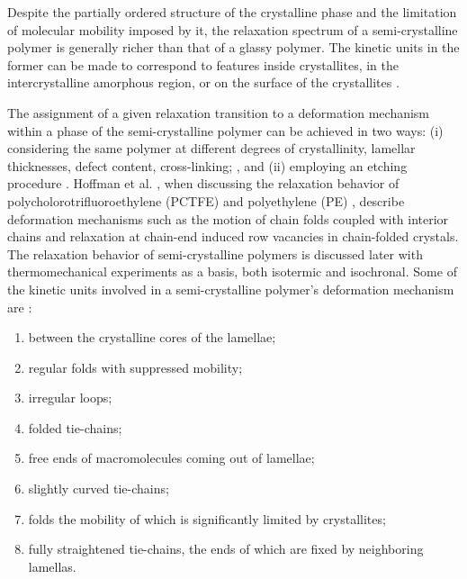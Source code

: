 Despite the partially ordered structure of the crystalline phase and the limitation of molecular mobility imposed by it, the relaxation spectrum of a semi-crystalline polymer is generally richer than that of a glassy polymer.
The kinetic units in the former can be made to correspond to features inside crystallites, in the intercrystalline amorphous region, or on the surface of the crystallites \citep{ferryViscoelasticPropertiesPolymers1980, arzhakovRelaxationPhysicalMechanical2019}.

The assignment of a given relaxation transition to a deformation mechanism within a phase of the semi-crystalline polymer can be achieved in two ways: (i) considering the same polymer at different degrees of crystallinity, lamellar thicknesses, defect content, cross-linking; \citep{ferryViscoelasticPropertiesPolymers1980}, and (ii) employing an etching procedure \citep{arzhakovRelaxationPhysicalMechanical2019}.
Hoffman et al. \citep{hoffmanAnalysisRelaxationsPolychlorotrifluoroethylene2007}, when discussing the relaxation behavior of polycholorotrifluoroethylene (PCTFE)   and polyethylene (PE)  , describe deformation mechanisms such as the motion of chain folds coupled with interior chains and relaxation at chain-end induced row vacancies in chain-folded crystals.
The relaxation behavior of semi-crystalline polymers is discussed later with thermomechanical experiments as a basis, both isotermic and isochronal.
Some of the kinetic units involved in a semi-crystalline polymer's deformation mechanism are \citep{arzhakovRelaxationPhysicalMechanical2019}:
\begin{enumerate}
    \item between the crystalline cores of the lamellae;
    \item regular folds with suppressed mobility;
    \item irregular loops;
    \item folded tie-chains;
    \item free ends of macromolecules coming out of lamellae;
    \item slightly curved tie-chains;
    \item folds the mobility of which is significantly limited by crystallites;
    \item fully straightened tie-chains, the ends of which are fixed by neighboring lamellas.
\end{enumerate}
